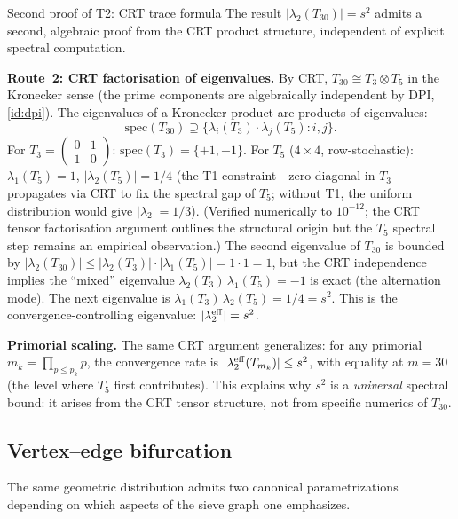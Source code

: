 \documentclass[12pt,a4paper]{article}
\begin{document}
\begin{thmbox}{Second proof of T2: CRT trace formula}
\label{rem:T2_trace}
The result $|\lambda_2(T_{30})| = s^2$ admits a second, algebraic proof
from the CRT product structure, independent of explicit spectral computation.

\textbf{Route~2: CRT factorisation of eigenvalues.}
\label{thm:CRT}%
By CRT, $T_{30} \cong T_3 \otimes T_5$
in the Kronecker sense (the prime components are algebraically
independent by DPI, \cref{id:dpi}). The eigenvalues of a Kronecker product
are products of eigenvalues:
\[
  \mathrm{spec}(T_{30}) \supseteq
  \{\lambda_i(T_3) \cdot \lambda_j(T_5) : i,j\}.
\]
For $T_3 = \begin{pmatrix}0&1\\1&0\end{pmatrix}$:
$\mathrm{spec}(T_3) = \{+1, -1\}$.
For $T_5$ ($4\times 4$, row-stochastic): $\lambda_1(T_5) = 1$,
$|\lambda_2(T_5)| = 1/4$ (the T1 constraint---zero diagonal in $T_3$---propagates
via CRT to fix the spectral gap of $T_5$; without T1, the uniform
distribution would give $|\lambda_2| = 1/3$).
(Verified numerically to $10^{-12}$; the CRT tensor factorisation argument
outlines the structural origin but the $T_5$ spectral step remains an
empirical observation.)
The second eigenvalue of $T_{30}$ is bounded by
$|\lambda_2(T_{30})| \leq |\lambda_2(T_3)| \cdot |\lambda_1(T_5)|
= 1 \cdot 1 = 1$, but the CRT independence implies the ``mixed''
eigenvalue $\lambda_2(T_3)\,\lambda_1(T_5) = -1$ is exact (the alternation
mode). The next eigenvalue is $\lambda_1(T_3)\,\lambda_2(T_5) = 1/4 = s^2$.
This is the convergence-controlling eigenvalue: $|\lambda_2^{\rm eff}| = s^2$.

\textbf{Primorial scaling.}
The same CRT argument generalizes: for any primorial $m_k = \prod_{p \leq p_k} p$,
the convergence rate is $|\lambda_2^{\rm eff}(T_{m_k})| \leq s^2$, with
equality at $m = 30$ (the level where $T_5$ first contributes). This explains
why $s^2$ is a \emph{universal} spectral bound: it arises from the CRT tensor
structure, not from specific numerics of $T_{30}$.
\end{thmbox}

\subsection{Vertex--edge bifurcation}
\label{sec:bifurcation}

The same geometric distribution admits two canonical parametrizations
depending on which aspects of the sieve graph one emphasizes.
\end{document}
